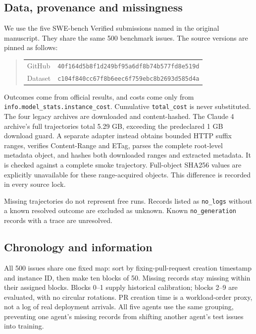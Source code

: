 \documentclass[11pt]{article}
\begin{document}
\subsection{Data, provenance and missingness}
We use the five SWE-bench Verified submissions named in the original manuscript. They share the same 500 benchmark issues. The source versions are pinned as follows:
\begin{quote}\small\begin{tabular}{@{}ll@{}}
GitHub & \texttt{40f164d5b8f1d249bf95a6df8b74b577fd8e519d} \\
Dataset & \texttt{c104f840cc67f8b6eec6f759ebc8b2693d585d4a}
\end{tabular}\end{quote}
 Outcomes come from official results, and costs come only from \texttt{info.model\_stats.instance\_cost}. Cumulative \texttt{total\_cost} is never substituted.
The four legacy archives are downloaded and content-hashed. The Claude 4 archive's full trajectories total 5.29 GB, exceeding the predeclared 1 GB download guard. A separate adapter instead obtains bounded HTTP suffix ranges, verifies Content-Range and ETag, parses the complete root-level metadata object, and hashes both downloaded ranges and extracted metadata. It is checked against a complete smoke trajectory. Full-object SHA256 values are explicitly unavailable for these range-acquired objects. This difference is recorded in every source lock.

Missing trajectories do not represent free runs. Records listed as \texttt{no\_logs} without a known resolved outcome are excluded as unknown. Known \texttt{no\_generation} records with a trace are unresolved. %

\subsection{Chronology and information}
All 500 issues share one fixed map: sort by fixing-pull-request creation timestamp and instance ID, then make ten blocks of 50. Missing records stay missing within their assigned blocks. Blocks 0--1 supply historical calibration; blocks 2--9 are evaluated, with no circular rotations. PR creation time is a workload-order proxy, not a log of real deployment arrivals. All five agents use the same grouping, preventing one agent's missing records from shifting another agent's test issues into training.
\end{document}
